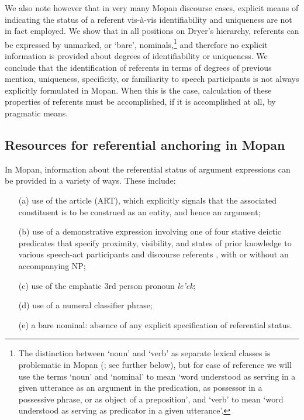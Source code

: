 \documentclass[output=paper]{langsci/langscibook}
\begin{document}
{
We also note however that in very many Mopan discourse cases, explicit means of indicating the status of a referent vis-\`a-vis identifiability and uniqueness are not in fact employed. We show that in all positions on Dryer's hierarchy, referents can be expressed by unmarked, or `bare', nominals,\footnote{The distinction between `noun' and `verb' as separate lexical classes is problematic in Mopan (\citealt{danziger:08}; see further below), but for ease of reference we will use the terms `noun' and `nominal' to mean `word understood as serving in a given utterance as an argument in the predication, as possessor in a possessive phrase, or as object of a preposition', and `verb' to mean `word understood as serving as predicator in a given utterance'.} and therefore no explicit information is provided about degrees of identifiability or uniqueness. We conclude that the identification of referents in terms of degrees of previous mention, uniqueness, specificity, or familiarity to speech participants is not always explicitly formulated in Mopan. When this is the case, calculation of these properties of referents must be accomplished, if it is accomplished at all, by pragmatic means.
}

\subsection{Resources for referential anchoring in Mopan}\label{3sec:11}
In Mopan, information about the referential status of argument expressions can be provided in a variety of ways. These include:

\begin{itemize}
\setlength\itemsep{-0.1em}
\item[(a)] use of the article (ART), which explicitly signals that the associated constituent is to be construed as an entity, and hence an argument; 
\item[(b)] use of a demonstrative expression involving one of four stative deictic predicates that specify proximity, visibility, and states of prior knowledge to various speech-act participants and discourse referents \citep{danziger:94}, with or without an accompanying NP; 
\item[(c)] use of the emphatic 3rd person pronoun {\emph{le'ek}}; %
\item[(d)] use of a numeral classifier phrase;
\item[(e)] a bare nominal: absence of any explicit specification of referential status. 
\end{itemize}
\end{document}
